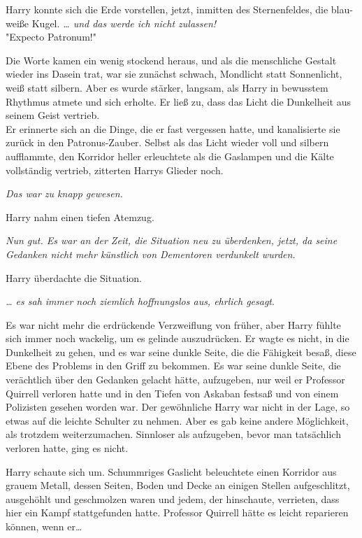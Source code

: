 {Harry konnte sich die Erde vorstellen, jetzt, inmitten des Sternenfeldes, die blau-weiße Kugel. \emph{… und das werde ich nicht zulassen!}\\

"Expecto Patronum!"

Die Worte kamen ein wenig stockend heraus, und als die menschliche Gestalt wieder ins Dasein trat, war sie zunächst schwach, Mondlicht statt Sonnenlicht, weiß statt silbern. Aber es wurde stärker, langsam, als Harry in bewusstem Rhythmus atmete und sich erholte. Er ließ zu, dass das Licht die Dunkelheit aus seinem Geist vertrieb.\\ Er erinnerte sich an die Dinge, die er fast vergessen hatte, und kanalisierte sie zurück in den Patronus-Zauber. Selbst als das Licht wieder voll und silbern aufflammte, den Korridor heller erleuchtete als die Gaslampen und die Kälte vollständig vertrieb, zitterten Harrys Glieder noch.

\emph{Das war zu knapp gewesen.}

Harry nahm einen tiefen Atemzug.

\emph{Nun gut. Es war an der Zeit, die Situation neu zu überdenken, jetzt, da seine Gedanken nicht mehr künstlich von Dementoren verdunkelt wurden.}

Harry überdachte die Situation.

\emph{… es sah immer noch ziemlich hoffnungslos aus, ehrlich gesagt}.

Es war nicht mehr die erdrückende Verzweiflung von früher, aber Harry fühlte sich immer noch wackelig, um es gelinde auszudrücken. Er wagte es nicht, in die Dunkelheit zu gehen, und es war seine dunkle Seite, die die Fähigkeit besaß, diese Ebene des Problems in den Griff zu bekommen. Es war seine dunkle Seite, die verächtlich über den Gedanken gelacht hätte, aufzugeben, nur weil er Professor Quirrell verloren hatte und in den Tiefen von Askaban festsaß und von einem Polizisten gesehen worden war. Der gewöhnliche Harry war nicht in der Lage, so etwas auf die leichte Schulter zu nehmen. Aber es gab keine andere Möglichkeit, als trotzdem weiterzumachen. Sinnloser als aufzugeben, bevor man tatsächlich verloren hatte, ging es nicht.

Harry schaute sich um. Schummriges Gaslicht beleuchtete einen Korridor aus grauem Metall, dessen Seiten, Boden und Decke an einigen Stellen aufgeschlitzt, ausgehöhlt und geschmolzen waren und jedem, der hinschaute, verrieten, dass hier ein Kampf stattgefunden hatte. Professor Quirrell hätte es leicht reparieren können, wenn er…

}
